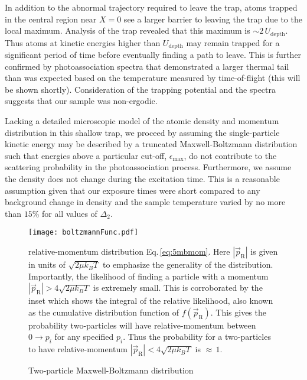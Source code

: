 In addition to the abnormal trajectory required to leave the trap, atoms trapped in the central region near $X=0$ see a larger barrier to leaving the trap due to the local maximum.
Analysis of the trap revealed that this maximum is $\sim 2 \, U_\text{depth}$.
Thus atoms at kinetic energies higher than $U_\text{depth}$ may remain trapped for a significant period of time before eventually finding a path to leave.
This is further confirmed by photoassociation spectra that demonstrated a larger thermal tail than was expected based on the temperature measured by time-of-flight (this will be shown shortly).
Consideration of the trapping potential and the spectra suggests that our sample was non-ergodic.

Lacking a detailed microscopic model of the atomic density and momentum distribution in this shallow trap, we proceed by assuming the single-particle kinetic energy may be described by a truncated Maxwell-Boltzmann distribution such that energies above a particular cut-off, $\epsilon_\text{max}$, do not contribute to the scattering probability in the photoassociation process.
Furthermore, we assume the density does not change during the excitation time.
This is a reasonable assumption given that our exposure times were short compared to any background change in density and the sample temperature varied by no more than $15$\% for all values of $\Delta_2$.
	\begin{figure} 
		\centerline{
		\texttt{[image: boltzmannFunc.pdf]}}
		\caption{Two-particle Maxwell-Boltzmann distribution}{relative-momentum distribution Eq.\,\ref{eq:5mbmom}. Here $|\vec{p}_\text{R}|$ is given in units of $\sqrt{2 \mu k_B T}$ to emphasize the generality of the distribution. Importantly, the likelihood of finding a particle with a momentum $|\vec{p}_\text{R}| > 4\sqrt{2 \mu k_B T}$ is extremely small. This is corroborated by the inset which shows the integral of the relative likelihood, also known as the cumulative distribution function of $f(\vec{p}_\text{R})$. This gives the probability two-particles will have relative-momentum between $0 \rightarrow p_i$ for any specified $p_i$. Thus the probability for a two-particles to have relative-momentum $|\vec{p}_\text{R}| < 4\sqrt{2 \mu k_B T}$ is $\approx\,1$.}
		\label{fig:singleBoltz}
	\end{figure}
	
